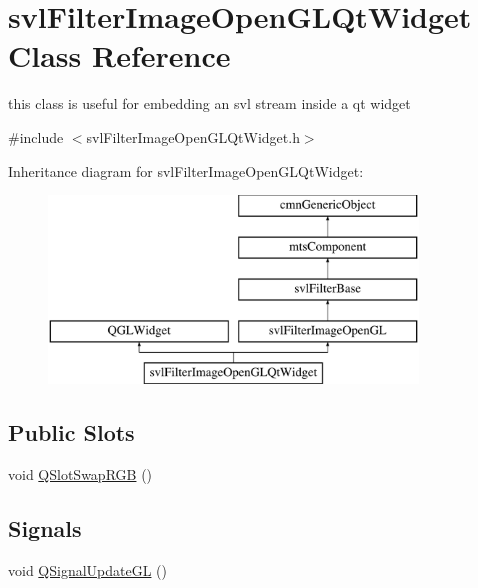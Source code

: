 \hypertarget{classsvl_filter_image_open_g_l_qt_widget}{\section{svl\-Filter\-Image\-Open\-G\-L\-Qt\-Widget Class Reference}
\label{classsvl_filter_image_open_g_l_qt_widget}
}


this class is useful for embedding an svl stream inside a qt widget  




{\ttfamily \#include $<$svl\-Filter\-Image\-Open\-G\-L\-Qt\-Widget.\-h$>$}

Inheritance diagram for svl\-Filter\-Image\-Open\-G\-L\-Qt\-Widget\-:\begin{figure}[H]
\begin{center}
\leavevmode
\includegraphics[height=5.000000cm]{d2/d20/classsvl_filter_image_open_g_l_qt_widget}
\end{center}
\end{figure}
\subsection*{Public Slots}
\begin{DoxyCompactItemize}
\item 
void \hyperlink{classsvl_filter_image_open_g_l_qt_widget_a8e92a0c6cc87fb73b435189c93a67d75}{Q\-Slot\-Swap\-R\-G\-B} ()
\end{DoxyCompactItemize}
\subsection*{Signals}
\begin{DoxyCompactItemize}
\item 
void \hyperlink{classsvl_filter_image_open_g_l_qt_widget_a8076cdeebadc488a9fe8e1db5e410168}{Q\-Signal\-Update\-G\-L} ()
\end{DoxyCompactItemize}
